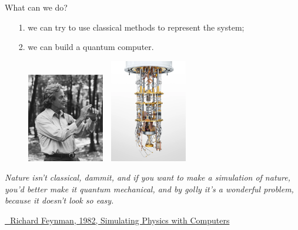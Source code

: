 \documentclass[aspectratio=169, 8pt, xcolor={svgnames}, hyperref={linkcolor=black}]{beamer}
\begin{document}
\begin{frame}{What can we do?}
\begin{itemize}[noitemsep]
\item[1.] we can try to use classical methods to represent the system;
\item[2.] we can build a quantum computer.
\end{itemize}
\begin{figure}
   \includegraphics[width=0.3\textwidth, height=0.55\textheight]{figures/feynmann.jpg}%
   $\,\,$ 
   \includegraphics[width=0.3\textwidth, height=0.55\textheight]{figures/qcomp.png}
\end{figure}

\small
\textit{Nature isn't classical, dammit, and if you want to make a simulation of nature, 
you'd better make it quantum mechanical, and by golly it's a wonderful problem, 
because it doesn't look so easy.} 

\href{https://link.springer.com/article/10.1007/BF02650179}{\faBook\,\, Richard Feynman, 1982, Simulating Physics with Computers}
\end{frame}
\end{document}
